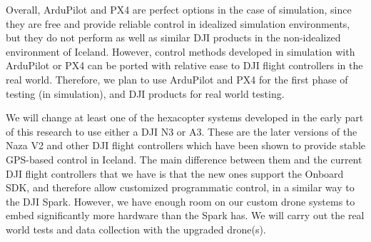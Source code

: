 Overall, ArduPilot and PX4 are perfect options in the case of simulation,
since they are free and provide reliable control in idealized simulation environments,
but they do not perform as well as similar DJI products in the non-idealized environment of Iceland.
However, control methods developed in simulation with ArduPilot or PX4 can be ported with relative ease to DJI flight controllers in the real world.
Therefore, we plan to use ArduPilot and PX4 for the first phase of testing (in simulation),
and DJI products for real world testing.

We will change at least one of the hexacopter systems developed in the early part of this research to use either a
DJI N3 or A3.
These are the later versions of the Naza V2 and other DJI flight controllers which have been shown to provide stable
GPS-based control in Iceland.
The main difference between them and the current DJI flight controllers that we have is that the new ones support the
Onboard SDK, and therefore allow customized programmatic control, in a similar way to the DJI Spark.
However, we have enough room on our custom drone systems to embed significantly more hardware than the Spark has.
We will carry out the real world tests and data collection with the upgraded drone(s).
